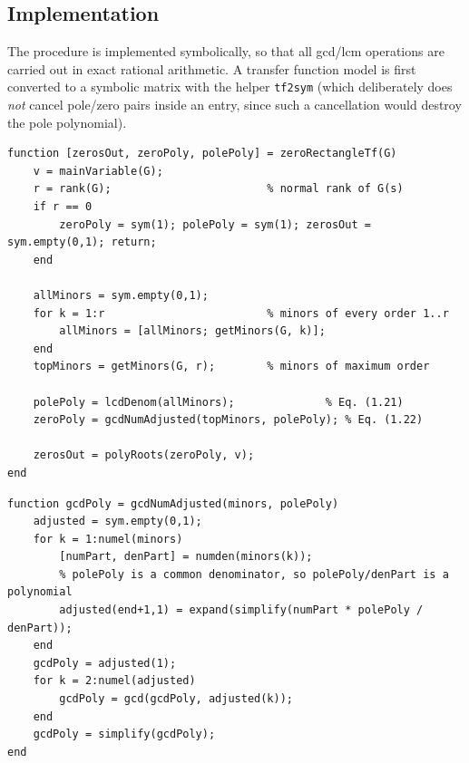 \subsection{Implementation}

The procedure is implemented symbolically, so that all gcd/lcm operations are carried out in
exact rational arithmetic. A transfer function model is first converted to a symbolic matrix
with the helper \texttt{tf2sym} (which deliberately does \emph{not} cancel pole/zero pairs inside
an entry, since such a cancellation would destroy the pole polynomial).

\begin{lstlisting}[caption={\texttt{zeroRectangleTf.m} -- main routine},captionpos=b]
function [zerosOut, zeroPoly, polePoly] = zeroRectangleTf(G)
    v = mainVariable(G);
    r = rank(G);                        % normal rank of G(s)
    if r == 0
        zeroPoly = sym(1); polePoly = sym(1); zerosOut = sym.empty(0,1); return;
    end

    allMinors = sym.empty(0,1);
    for k = 1:r                         % minors of every order 1..r
        allMinors = [allMinors; getMinors(G, k)];
    end
    topMinors = getMinors(G, r);        % minors of maximum order

    polePoly = lcdDenom(allMinors);              % Eq. (1.21)
    zeroPoly = gcdNumAdjusted(topMinors, polePoly); % Eq. (1.22)

    zerosOut = polyRoots(zeroPoly, v);
end
\end{lstlisting}

\begin{lstlisting}[caption={Rewriting the maximal minors over $p(s)$ before taking the gcd},captionpos=b]
function gcdPoly = gcdNumAdjusted(minors, polePoly)
    adjusted = sym.empty(0,1);
    for k = 1:numel(minors)
        [numPart, denPart] = numden(minors(k));
        % polePoly is a common denominator, so polePoly/denPart is a polynomial
        adjusted(end+1,1) = expand(simplify(numPart * polePoly / denPart));
    end
    gcdPoly = adjusted(1);
    for k = 2:numel(adjusted)
        gcdPoly = gcd(gcdPoly, adjusted(k));
    end
    gcdPoly = simplify(gcdPoly);
end
\end{lstlisting}

